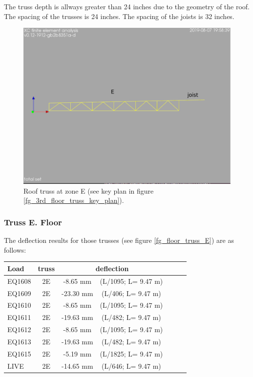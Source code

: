 \noindent The truss depth is allways greater than 24 inches due to the geometry of the roof. The spacing of the trusses is 24 inches. The spacing of the joists is 32 inches.

\begin{figure}
  \begin{center}
  \includegraphics[width=120mm]{figures/roof_truss_E}
  \end{center}
  \caption{Roof truss at zone E (see key plan in figure \ref{fg_3rd_floor_truss_key_plan}).}\label{fg_roof_truss_E}
\end{figure}

\subsubsection{Truss E. Floor}
The deflection results for those trusses (see figure \ref{fg_floor_truss_E}) are as follows:

\begin{center}
  \begin{scriptsize}
  \begin{tabular}{|l|c|c|c|c|c|c|}
    \hline
    \textbf{Load} & \textbf{truss} & \multicolumn{2}{c|}{\textbf{deflection}} \\
    \hline
EQ1608 & 2E & -8.65 mm & (L/1095; L= 9.47 m) \\
EQ1609 & 2E & -23.30 mm & (L/406; L= 9.47 m) \\
EQ1610 & 2E & -8.65 mm & (L/1095; L= 9.47 m) \\
EQ1611 & 2E & -19.63 mm & (L/482; L= 9.47 m) \\
EQ1612 & 2E & -8.65 mm & (L/1095; L= 9.47 m) \\
EQ1613 & 2E & -19.63 mm & (L/482; L= 9.47 m) \\
EQ1615 & 2E & -5.19 mm & (L/1825; L= 9.47 m) \\
LIVE & 2E & -14.65 mm & (L/646; L= 9.47 m) \\
\hline
  \end{tabular}
  \end{scriptsize}
\end{center}

